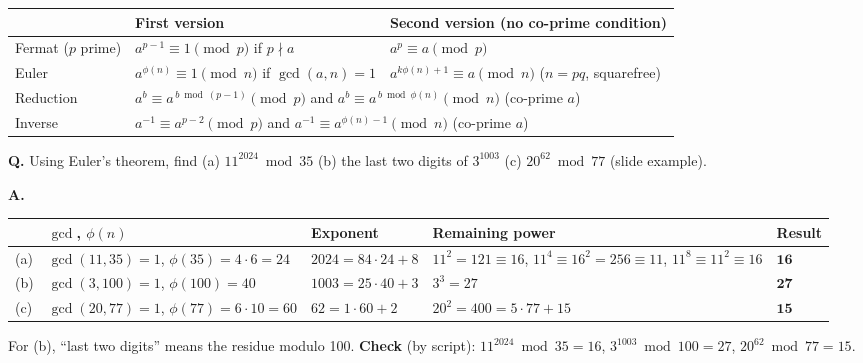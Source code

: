 \begin{mustknow}
\begin{center}\small
\begin{tabular}{@{}lll@{}}
\toprule
 & First version & Second version (no co-prime condition)\\
\midrule
Fermat ($p$ prime) & $a^{p-1} \equiv 1 \pmod p$ if $p \nmid a$ & $a^p \equiv a \pmod p$\\
Euler & $a^{\phi(n)} \equiv 1 \pmod n$ if $\gcd(a,n) = 1$ & $a^{k\phi(n)+1} \equiv a \pmod n$ ($n = pq$, squarefree)\\
\midrule
Reduction & \multicolumn{2}{l}{$a^b \equiv a^{\,b \bmod (p-1)} \pmod p$ \quad and \quad $a^b \equiv a^{\,b \bmod \phi(n)} \pmod n$ \quad (co-prime $a$)}\\
Inverse & \multicolumn{2}{l}{$a^{-1} \equiv a^{p-2} \pmod p$ \quad and \quad $a^{-1} \equiv a^{\phi(n)-1} \pmod n$ \quad (co-prime $a$)}\\
\bottomrule
\end{tabular}
\end{center}
\end{mustknow}

\begin{worked}
\textbf{Q.} Using Euler's theorem, find (a) $11^{2024} \bmod 35$ (b) the last two digits of $3^{1003}$ (c) $20^{62} \bmod 77$ (slide example).

\textbf{A.}
\begin{center}\small
\begin{tabular}{@{}lllll@{}}
\toprule
 & $\gcd$, $\phi(n)$ & Exponent & Remaining power & Result\\
\midrule
(a) & $\gcd(11, 35) = 1$, $\phi(35) = 4 \cdot 6 = 24$ & $2024 = 84\cdot24 + 8$ & $11^2 = 121 \equiv 16$, $11^4 \equiv 16^2 = 256 \equiv 11$, $11^8 \equiv 11^2 \equiv 16$ & $\mathbf{16}$\\
(b) & $\gcd(3, 100) = 1$, $\phi(100) = 40$ & $1003 = 25\cdot40 + 3$ & $3^3 = 27$ & $\mathbf{27}$\\
(c) & $\gcd(20, 77) = 1$, $\phi(77) = 6 \cdot 10 = 60$ & $62 = 1\cdot60 + 2$ & $20^2 = 400 = 5\cdot77 + 15$ & $\mathbf{15}$\\
\bottomrule
\end{tabular}
\end{center}
For (b), ``last two digits'' means the residue modulo 100. \textbf{Check} (by script): $11^{2024} \bmod 35 = 16$, $3^{1003} \bmod 100 = 27$, $20^{62} \bmod 77 = 15$.
\end{worked}

